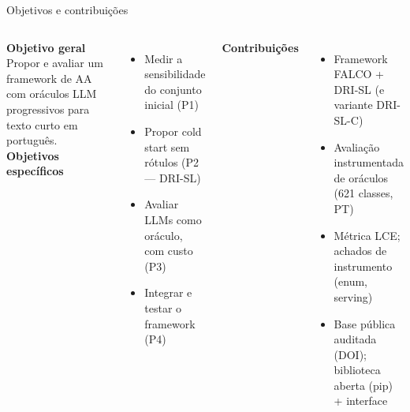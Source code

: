 \documentclass[aspectratio=169,11pt]{beamer}
\begin{document}
\begin{frame}{Objetivos e contribuições}
\begin{columns}[T]
\textbf{Objetivo geral}\\
\footnotesize Propor e avaliar um framework de AA com oráculos LLM
progressivos para texto curto em português.
\vspace{0.6em}\\
\textbf{Objetivos específicos}
\begin{itemize}\footnotesize
  \item Medir a sensibilidade do conjunto inicial (P1)
  \item Propor cold start sem rótulos (P2 --- DRI-SL)
  \item Avaliar LLMs como oráculo, com custo (P3)
  \item Integrar e testar o framework (P4)
\end{itemize}
\textbf{Contribuições}
\begin{itemize}\footnotesize
  \item Framework FALCO + DRI-SL (e variante DRI-SL-C)
  \item Avaliação instrumentada de oráculos (621 classes, PT)
  \item Métrica LCE; achados de instrumento (enum, serving)
  \item Base pública auditada (DOI); biblioteca aberta (pip) + interface
\end{itemize}
\end{columns}
\end{frame}


\end{document}
